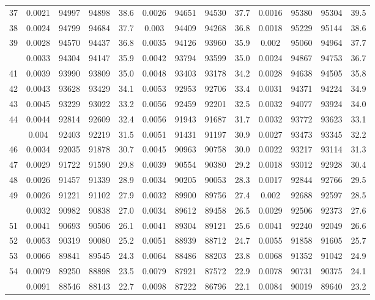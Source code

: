 \documentclass[
  14pt,
]{article}
\begin{document}
\begin{longtable}[t]{lcccccccccccc}
37 & 0.0021 & 94997 & 94898 & 38.6 & 0.0026 & 94651 & 94530 & 37.7 & 0.0016 & 95380 & 95304 & 39.5\\
38 & 0.0024 & 94799 & 94684 & 37.7 & 0.003 & 94409 & 94268 & 36.8 & 0.0018 & 95229 & 95144 & 38.6\\
39 & 0.0028 & 94570 & 94437 & 36.8 & 0.0035 & 94126 & 93960 & 35.9 & 0.002 & 95060 & 94964 & 37.7\\
\addlinespace
40 & 0.0033 & 94304 & 94147 & 35.9 & 0.0042 & 93794 & 93599 & 35.0 & 0.0024 & 94867 & 94753 & 36.7\\
41 & 0.0039 & 93990 & 93809 & 35.0 & 0.0048 & 93403 & 93178 & 34.2 & 0.0028 & 94638 & 94505 & 35.8\\
42 & 0.0043 & 93628 & 93429 & 34.1 & 0.0053 & 92953 & 92706 & 33.4 & 0.0031 & 94371 & 94224 & 34.9\\
43 & 0.0045 & 93229 & 93022 & 33.2 & 0.0056 & 92459 & 92201 & 32.5 & 0.0032 & 94077 & 93924 & 34.0\\
44 & 0.0044 & 92814 & 92609 & 32.4 & 0.0056 & 91943 & 91687 & 31.7 & 0.0032 & 93772 & 93623 & 33.1\\
\addlinespace
45 & 0.004 & 92403 & 92219 & 31.5 & 0.0051 & 91431 & 91197 & 30.9 & 0.0027 & 93473 & 93345 & 32.2\\
46 & 0.0034 & 92035 & 91878 & 30.7 & 0.0045 & 90963 & 90758 & 30.0 & 0.0022 & 93217 & 93114 & 31.3\\
47 & 0.0029 & 91722 & 91590 & 29.8 & 0.0039 & 90554 & 90380 & 29.2 & 0.0018 & 93012 & 92928 & 30.4\\
48 & 0.0026 & 91457 & 91339 & 28.9 & 0.0034 & 90205 & 90053 & 28.3 & 0.0017 & 92844 & 92766 & 29.5\\
49 & 0.0026 & 91221 & 91102 & 27.9 & 0.0032 & 89900 & 89756 & 27.4 & 0.002 & 92688 & 92597 & 28.5\\
\addlinespace
50 & 0.0032 & 90982 & 90838 & 27.0 & 0.0034 & 89612 & 89458 & 26.5 & 0.0029 & 92506 & 92373 & 27.6\\
51 & 0.0041 & 90693 & 90506 & 26.1 & 0.0041 & 89304 & 89121 & 25.6 & 0.0041 & 92240 & 92049 & 26.6\\
52 & 0.0053 & 90319 & 90080 & 25.2 & 0.0051 & 88939 & 88712 & 24.7 & 0.0055 & 91858 & 91605 & 25.7\\
53 & 0.0066 & 89841 & 89545 & 24.3 & 0.0064 & 88486 & 88203 & 23.8 & 0.0068 & 91352 & 91042 & 24.9\\
54 & 0.0079 & 89250 & 88898 & 23.5 & 0.0079 & 87921 & 87572 & 22.9 & 0.0078 & 90731 & 90375 & 24.1\\
\addlinespace
55 & 0.0091 & 88546 & 88143 & 22.7 & 0.0098 & 87222 & 86796 & 22.1 & 0.0084 & 90019 & 89640 & 23.2\\

\end{longtable}
\end{document}
